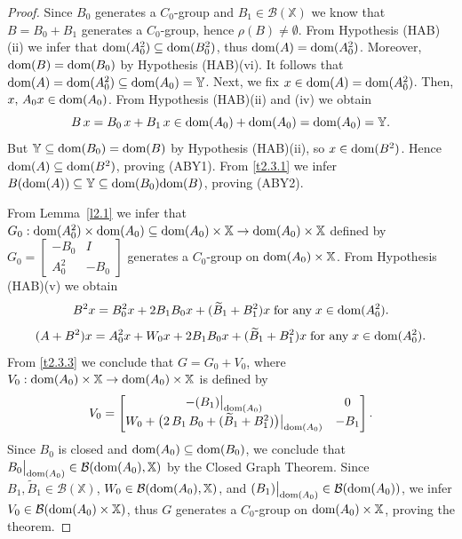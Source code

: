 \documentclass[11pt]{amsart}
\numberwithin{equation}{section}
\newcommand{\A }{\mathcal{A}}
\theoremstyle{remark}
\theoremstyle{definition}
\newcommand\bX{{\mathbb X}}
\newcommand\bY{{\mathbb Y}}
\newcommand{\dom}{\text{\rm{dom}}}
\begin{document}
\begin{proof}
	Since $B_0$ generates a $C_0$-group and $B_1\in\mathcal{B}(\bX)$ we know that $B=B_0+B_1$ generates a $C_0$-group, hence $\rho(B)\ne\emptyset$. From Hypothesis (HAB) (ii) we infer that $\dom(A_0^2)\subseteq\dom(B_0^2)$, thus $\dom(A) = \dom(A_0^2)$. Moreover, $\dom(B)=\dom(B_0)$ by Hypothesis (HAB)(vi). It follows that $\dom(A) = \dom(A_0^2) \subseteq \dom(A_0) = \bY$. Next, we fix $x \in \dom(A) = \dom(A_0^2)$. Then, $x,\,A_0 x \in \dom(A_0)$.
	From Hypothesis (HAB)(ii) and (iv) we obtain \begin{equation}\label{t2.3.1}
		B\,x = B_0\,x + B_1\,x \in \dom(A_0) + \dom(A_0) = \dom(A_0) = \bY.
	\end{equation}
	But $\bY \subseteq \dom(B_0)=\dom(B)$ by Hypothesis (HAB)(ii), so $x \in \dom(B^2)$.
	Hence $\dom(A) \subseteq \dom(B^2)$, proving (ABY1). From \eqref{t2.3.1} we infer $B(\dom(A)) \subseteq \bY \subseteq \dom(B_0)\dom(B)$, proving (ABY2).
	
	From Lemma~\ref{l2.1} we infer that  $G_0:\dom(A_0^2)\times\dom(A_0)\subseteq \dom(A_0)\times\bX\to\dom(A_0)\times\bX$ defined by $G_0=\left[\begin{smallmatrix}-B_0&I\\A_0^2&-B_0\end{smallmatrix}\right]$ generates a $C_0$-group on $\dom(A_0)\times\bX$. From Hypothesis (HAB)(v) we  obtain
	\begin{equation}\label{t2.3.2}
		B^2 x = B_0^2 x+2B_1 B_0 x+(\widetilde{B}_1+B_1^2)x\;\mbox{for any}\;x\in\dom(A_0^2).
	\end{equation}
	\begin{equation}\label{t2.3.3}
		(A+B^2)x=A_0^2x+W_0x+2B_1B_0x + (\widetilde{B}_1 + B_1^2)x\;\mbox{for any}\;x\in\dom(A_0^2).
	\end{equation}
	From \eqref{t2.3.3} we conclude that $G=G_0+V_0$, where $V_0:\dom(A_0)\times\bX\to\dom(A_0)\times\bX$ is defined by
	\begin{equation}\label{t2.3.4}
		V_0 = \begin{bmatrix}
			-(B_1)\big|_{\dom(A_0)} & 0 \\
			W_0 + \big(2\,B_1\,B_0 + (\widetilde{B}_1 + B_1^2)\big)\big|_{\dom(A_0)} & -B_1
		\end{bmatrix}.	
	\end{equation}	
Since $B_0$ is closed and $\dom(A_0) \subseteq \dom(B_0)$, we conclude that
$B_0\big|_{\dom(A_0)} \in \mathcal{B}(\dom(A_0), \bX)$ by the Closed Graph Theorem.
Since $B_1, \widetilde{B}_1 \in \mathcal{B}(\bX)$, $W_0 \in \mathcal{B}(\dom(A_0), \bX)$,
and $(B_1)\big|_{\dom(A_0)} \in \mathcal{B}(\dom(A_0))$, we infer
	$V_0 \in \mathcal{B}(\dom(A_0) \times \bX)$, thus $G$ generates a $C_0$-group on $\dom(A_0)\times\bX$, proving the theorem.
\end{proof}	
\end{document}
